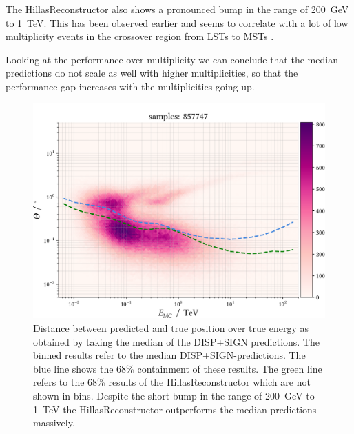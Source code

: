 The HillasReconstructor also shows a pronounced bump in the range of \SI{200}{\giga\electronvolt}
to \SI{1}{\tera\electronvolt}. 
This has been observed earlier and seems to correlate with 
a lot of low multiplicity events in the crossover region from LSTs to MSTs \cite{kai? max?}.

Looking at the performance over multiplicity we can conclude that the median predictions
do not scale as well with higher multiplicities, so that the performance gap increases with
the multiplicities going up.

\begin{figure}
    \centering
    \captionsetup{width=0.9\linewidth}
    \includegraphics[width=0.9\linewidth]{../analysis/plots/gamma/median_vs_energy.pdf} 
    \caption{Distance between predicted and true position over true energy as obtained by taking the median of
    the DISP+SIGN predictions.
    The binned results refer to the median DISP+SIGN-predictions. The blue line shows the 
    68\% containment of these results. The green line refers to the 68\%
    results of the HillasReconstructor which are not shown in bins.
    Despite the short bump in the range of \SI{200}{\giga\electronvolt}
    to \SI{1}{\tera\electronvolt} the HillasReconstructor outperforms the median predictions
    massively.}
    \label{fig:stereo_median_energy}
\end{figure}

